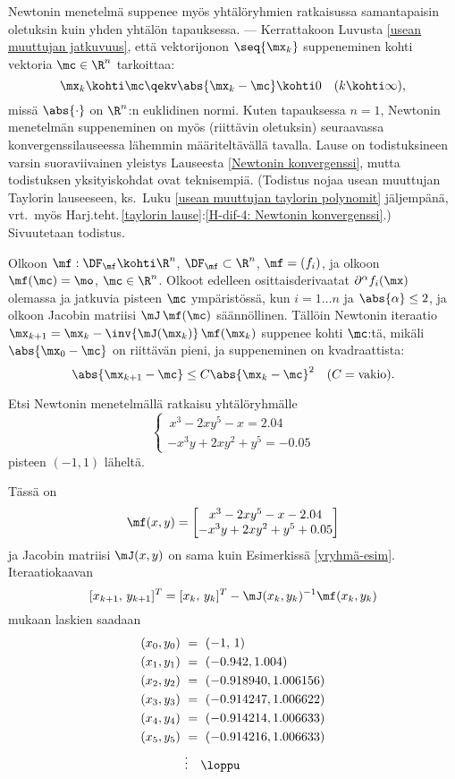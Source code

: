 Newtonin menetelmä suppenee myös yhtälöryhmien ratkaisussa samantapaisin oletuksin kuin yhden 
yhtälön tapauksessa. --- Kerrattakoon Luvusta \ref{usean muuttujan jatkuvuus}, että
vektorijonon $\seq{\mx_k}$ suppeneminen kohti vektoria $\mc\in\R^n$ tarkoittaa:
\[
\mx_k \kohti \mc \qekv \abs{\mx_k-\mc} \kohti 0 \quad (k\kohti\infty),
\]
missä $\abs{\cdot}$ on $\R^n$:n euklidinen normi. Kuten tapauksessa $n=1$, Newtonin menetelmän
%
suppeneminen on myös (riittävin oletuksin)  seuraavassa
konvergenssilauseessa lähemmin määriteltävällä tavalla. Lause on todistuksineen varsin
suoraviivainen yleistys Lauseesta \ref{Newtonin konvergenssi}, mutta todistuksen yksityiskohdat
ovat teknisempiä. (Todistus nojaa usean muuttujan Taylorin lauseeseen, ks.\ Luku
\ref{usean muuttujan taylorin polynomit} jäljempänä, vrt.\ myös
Harj.teht.\,\ref{taylorin lause}:\ref{H-dif-4: Newtonin konvergenssi}.) Sivuutetaan todistus.
\begin{Lause} \label{Newtonin konvergenssi -Rn}
Olkoon $\mf:\DF_\mf\kohti\R^n$, $\DF_\mf\subset\R^n$, $\mf=(f_i)$, ja olkoon $\mf(\mc)=\mo$, 
$\mc\in\R^n$. Olkoot edelleen osittaisderivaatat $\partial^\alpha  f_i(\mx)$ olemassa ja 
jatkuvia pisteen $\mc$ ympäristössä, kun $i=1\ldots n$ ja $\abs{\alpha}\leq 2$, ja olkoon 
Jacobin matriisi $\mJ\,\mf(\mc)$ säännöllinen. Tällöin Newtonin iteraatio 
$\mx_{k+1}=\mx_k-\inv{\mJ(\mx_k)}\,\mf(\mx_k)$ suppenee kohti $\mc$:tä, mikäli $\abs{\mx_0-\mc}$
on riittävän pieni, ja suppeneminen on kvadraattista:
\[
\abs{\mx_{k+1}-\mc}\leq C\abs{\mx_k-\mc}^2\quad (C=\text{vakio}).
\]
\end{Lause}
\begin{Exa} \label{Newton-2d: ex1} Etsi Newtonin menetelmällä ratkaisu yhtälöryhmälle 
\[ \begin{cases}
    \,x^3-2xy^5-x=2.04 \\
    -x^3y+2xy^2+y^5=-0.05
\end{cases} \]
pisteen $(-1,1)$ läheltä. 
\end{Exa}
\ratk Tässä on
\[
\mf(x,y)= \begin{bmatrix} x^3-2xy^5-x-2.04 \\ -x^3y+2xy^2+y^5+0.05 \end{bmatrix}
\]
ja Jacobin matriisi $\mJ(x,y)$ on sama kuin Esimerkissä \ref{yryhmä-esim}. Iteraatiokaavan
\[
[x_{k+1},\,y_{k+1}]^T = [x_k,\,y_k]^T -\mJ(x_k,y_k)^{-1}\mf(x_k,y_k)
\]
mukaan laskien saadaan
\begin{align*}
                       (x_0,y_0)\ &=\ (-1,\,1) \\
                       (x_1,y_1)\ &=\ (-0.942,1.004) \\
                       (x_2,y_2)\ &=\ (-0.918940,1.006156) \\
                       (x_3,y_3)\ &=\ (-0.914247,1.006622) \\
                       (x_4,y_4)\ &=\ (-0.914214,1.006633) \\
                       (x_5,y_5)\ &=\ (-0.914216,1.006633) \\
                                  &\vdots \quad \loppu
\end{align*}


